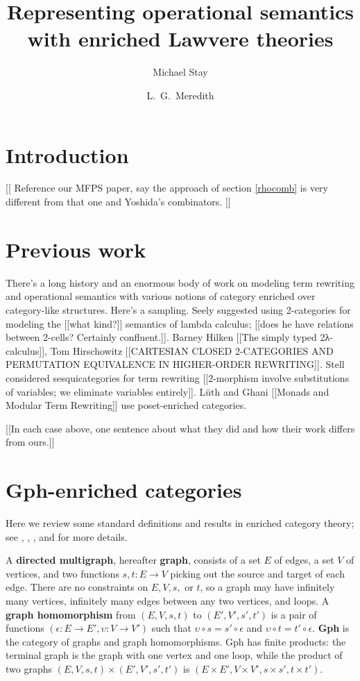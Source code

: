 \documentclass[a4paper,UKenglish]{lipics-v2016}
\title{Representing operational semantics with enriched Lawvere theories}
\author[1]{
Michael Stay
}
\author[2]{
L.\ G.\ Meredith
}
\affil[1]{
  Pyrofex Corp., Kirkland, WA, USA\\
  {\tt stay@pyrofex.net}
}
\affil[2]{
{RChain Cooperative}\\
{\tt greg@rchain.coop}
}
\newcommand{\maps}{\colon}
\begin{document}
\maketitle
\begin{abstract}
\noindent
\end{abstract}
\EnableBpAbbreviations

\section{Introduction}
[[ Reference our MFPS paper, say the approach of section \ref{rhocomb} is very different from that one and Yoshida's combinators. ]]

\section{Previous work}
There's a long history and an enormous body of work on modeling term rewriting and operational semantics with various notions of category enriched over category-like structures.  Here's a sampling.  Seely \cite{Seely} suggested using 2-categories for modeling the [[what kind?]] semantics of lambda calculus; [[does he have relations between 2-cells?  Certainly confluent.]].  Barney Hilken [[The simply typed 2λ-calculus]], Tom Hirschowitz [[CARTESIAN CLOSED 2-CATEGORIES AND PERMUTATION EQUIVALENCE IN HIGHER-ORDER REWRITING]].  Stell \cite{Stell}
considered sesquicategories for term rewriting [[2-morphism involve substitutions of variables; we eliminate variables entirely]].  L\"uth and Ghani [[Monads and Modular Term Rewriting]] use poset-enriched categories.

[[In each case above, one sentence about what they did and how their work differs from ours.]]

\section{Gph-enriched categories}
Here we review some standard definitions and results in enriched category theory; see \cite{CIS-335497}, \cite{Power99EnrichedLawvereTheories}, \cite{DBLP:journals/acs/LackR11}, and \cite{Trimble} for more details.

A {\bf directed multigraph}, hereafter {\bf graph}, consists of a set $E$ of edges, a set $V$ of vertices, and two functions $s,t\maps E \to V$ picking out the source and target of each edge.  There are no constraints on $E, V, s,$ or $t$, so a graph may have infinitely many vertices, infinitely many edges between any two vertices, and loops.  A {\bf graph homomorphism} from $(E, V, s, t)$ to $(E', V', s', t')$ is a pair of functions $(\epsilon\maps E \to E', \upsilon\maps V \to V')$ such that $\upsilon\circ s = s' \circ \epsilon$ and $\upsilon\circ t = t' \circ \epsilon$.  {\bf Gph} is the category of graphs and graph homomorphisms.  Gph has finite products: the terminal graph is the graph with one vertex and one loop, while the product of two graphs $(E, V, s, t) \times (E', V', s', t')$ is $(E \times E', V \times V', s \times s', t\times t').$
\end{document}
